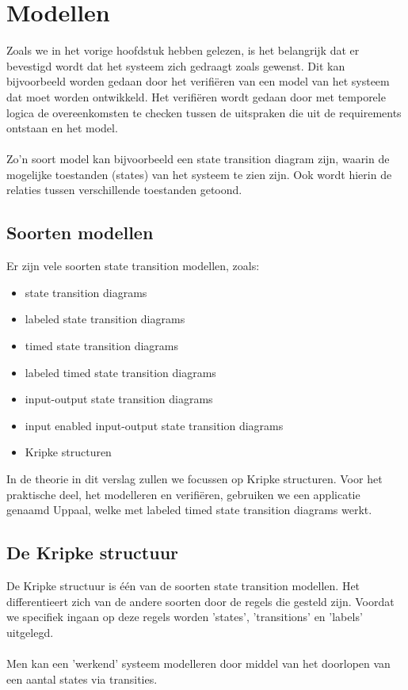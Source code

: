 \documentclass{article}
\begin{document}
\newpage
\section{Modellen}
  Zoals we in het vorige hoofdstuk hebben gelezen, is het belangrijk dat er bevestigd wordt dat het systeem zich gedraagt zoals gewenst. Dit kan bijvoorbeeld worden gedaan door het verifiëren van een model van het systeem dat moet worden ontwikkeld. Het verifiëren wordt gedaan door met temporele logica de overeenkomsten te checken tussen de uitspraken die uit de requirements ontstaan en het model. \\\\
  Zo'n soort model kan bijvoorbeeld een state transition diagram zijn, waarin de mogelijke toestanden (states) van het systeem te zien zijn. Ook wordt hierin de relaties tussen verschillende toestanden getoond.

  \subsection{Soorten modellen}
    Er zijn vele soorten state transition modellen, zoals:
    \begin{itemize}
      \item state transition diagrams
      \item labeled state transition diagrams
      \item timed state transition diagrams
      \item labeled timed state transition diagrams
      \item input-output state transition diagrams
      \item input enabled input-output state transition diagrams
      \item Kripke structuren
    \end{itemize}
    In de theorie in dit verslag zullen we focussen op Kripke structuren. Voor het praktische deel, het modelleren en verifiëren, gebruiken we een applicatie genaamd Uppaal, welke met labeled timed state transition diagrams werkt.

  \subsection{De Kripke structuur}
    De Kripke structuur is één van de soorten state transition modellen. Het differentieert zich van de andere soorten door de regels die gesteld zijn. Voordat we specifiek ingaan op deze regels worden 'states', 'transitions' en 'labels' uitgelegd. \\\\
    Men kan een 'werkend' systeem modelleren door middel van het doorlopen van een aantal states via transities.
\end{document}
